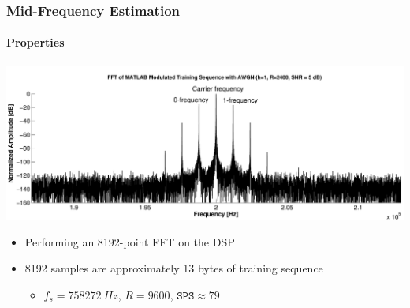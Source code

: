 \begin{frame} \frametitle{Mid-Frequency Estimation}
    \framesubtitle{Properties}
    \begin{center}
        \includegraphics[width=1.0\textwidth]{img/fft_train_seq}
    \end{center}
    \begin{itemize}
        \item Performing an 8192-point FFT on the DSP
        \item 8192 samples are approximately 13 bytes of training sequence
        \begin{itemize}
            \item $f_s = \SI{758272}{Hz}$, $R = 9600$, $\texttt{SPS} \approx 79$
        \end{itemize}
    \end{itemize}
    \begin{center}
    \end{center}
\end{frame}

